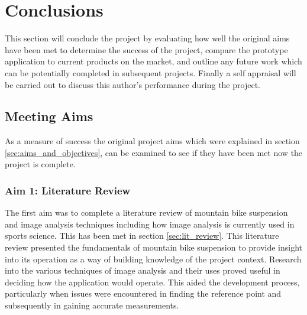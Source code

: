 \section{Conclusions}\label{sec:conclusion}
	This section will conclude the project by evaluating how well the original aims have been met to determine the success of the project, compare the prototype application to current products on the market, and outline any future work which can be potentially completed in subsequent projects. Finally a self appraisal will be carried out to discuss this author's performance during the project.
	\subsection{Meeting Aims}
		As a measure of success the original project aims which were explained in section \ref{sec:aims_and_objectives}, can be examined to see if they have been met now the project is complete. 
		\subsubsection{Aim 1: Literature Review}
			The first aim was to complete a literature review of mountain bike suspension and image analysis techniques including how image analysis is currently used in sports science. This has been met in section \ref{sec:lit_review}. This literature review presented the fundamentals of mountain bike suspension to provide insight into its operation as a way of building knowledge of the project context. Research into the various techniques of image analysis and their uses proved useful in deciding how the application would operate. This aided the development process, particularly when issues were encountered in finding the reference point and subsequently in gaining accurate measurements.
